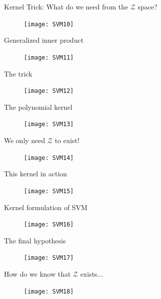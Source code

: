 \begin{frame}{Kernel Trick: What do we need from the $\mathcal{Z}$ space?}
\begin{figure}
\texttt{[image: SVM10]}
\end{figure}
\end{frame}

\begin{frame}{Generalized inner product}
\begin{figure}
\texttt{[image: SVM11]}
\end{figure}
\end{frame}

\begin{frame}{The trick}
\begin{figure}
\texttt{[image: SVM12]}
\end{figure}
\end{frame}

\begin{frame}{The polynomial kernel}
\begin{figure}
\texttt{[image: SVM13]}
\end{figure}
\end{frame}

\begin{frame}{We only need $\mathcal{Z}$ to exist!}
\begin{figure}
\texttt{[image: SVM14]}
\end{figure}
\end{frame}

\begin{frame}{This kernel in action}
\begin{figure}
\texttt{[image: SVM15]}
\end{figure}
\end{frame}

\begin{frame}{Kernel formulation of SVM}
\begin{figure}
\texttt{[image: SVM16]}
\end{figure}
\end{frame}

\begin{frame}{The final hypothesis}
\begin{figure}
\texttt{[image: SVM17]}
\end{figure}
\end{frame}

\begin{frame}{How do we know that $\mathcal{Z}$ exists...}
\begin{figure}
\texttt{[image: SVM18]}
\end{figure}
\end{frame}

